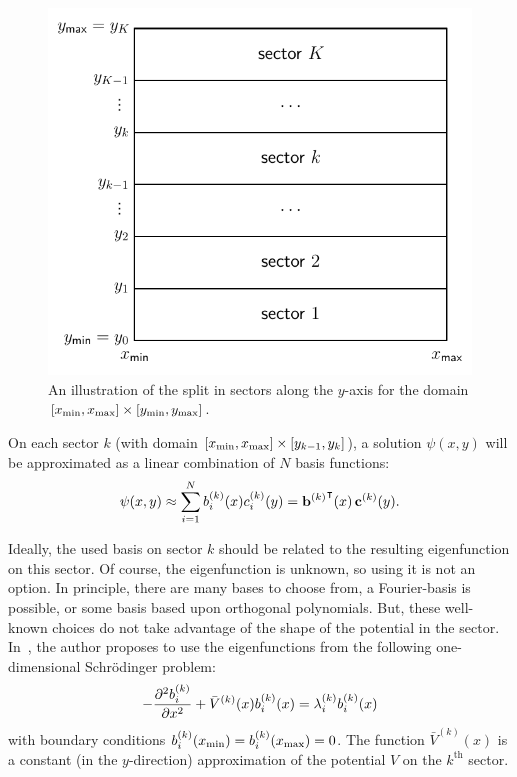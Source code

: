 \begin{figure}
  \begin{center}
    \includegraphics[width=.6\textwidth]{img/chapter3/2dsectors.pdf}
    \caption{\label{fig:c3_2dsectors} An illustration of the split in sectors along the $y$-axis for the domain $[{x_{\text{min}}}, {x_{\text{max}}}]\times[{y_{\text{min}}}, {y_{\text{max}}}]$.}
  \end{center}
\end{figure}

On each sector $k$ (with domain $[{x_{\text{min}}}, {x_{\text{max}}}]\times[y_{k-1}, y_k]$), a solution $\psi(x, y)$ will be approximated as a linear combination of $N$ basis functions:
\begin{equation}\label{equ:c3_lincomb_basis}
  \psi(x, y) \approx \sum_{i=1}^{N} b_i^{(k)}(x) c_i^{(k)}(y) = {{\vb{b}^{(k)}}}^\intercal(x) \, \vb{c}^{(k)}(y) \text{.}
\end{equation}

Ideally, the used basis on sector $k$ should be related to the resulting eigenfunction on this sector. Of course, the eigenfunction is unknown, so using it is not an option. In principle, there are many bases to choose from, a Fourier-basis is possible, or some basis based upon orthogonal polynomials. But, these well-known choices do not take advantage of the shape of the potential in the sector. In~\cite{ixaru_new_2010}, the author proposes to use the eigenfunctions from the following one-dimensional Schrödinger problem:
\begin{equation}\label{equ:c3_one_dimensional_schrodinger}
  -\pdv[2]{b_i^{(k)}}{x} + \bar{V}^{(k)}(x)b_i^{(k)}(x) = \lambda_i^{(k)} b_i^{(k)}(x)
\end{equation}
with boundary conditions $b_i^{(k)}({x_{\text{min}}}) = b_i^{(k)}({x_{\text{max}}}) = 0$. The function $\bar{V}^{(k)}(x)$ is a constant (in the $y$-direction) approximation of the potential $V$ on the $k^\text{th}$ sector.


